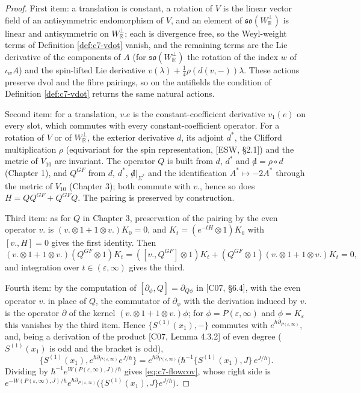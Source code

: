 \begin{proof}
First item: a translation is constant, a rotation of $V$ is the linear vector field of an antisymmetric endomorphism of $V$, and an element of $\mathfrak{so}(W_{\mathbb R}^\perp)$ is linear and antisymmetric on $W_{\mathbb R}^\perp$; each is divergence free, so the Weyl-weight terms of Definition \ref{def:c7-vdot} vanish, and the remaining terms are the Lie derivative of the components of $A$ (for $\mathfrak{so}(W_{\mathbb R}^\perp)$ the rotation of the index $w$ of $\iota_wA$) and the spin-lifted Lie derivative $v(\lambda)+\tfrac14\rho(d(v,-))\lambda$. These actions preserve $\mathrm{dvol}$ and the fibre pairings, so on the antifields the condition of Definition \ref{def:c7-vdot} returns the same natural actions.

Second item: for a translation, $v.e$ is the constant-coefficient derivative $v_1(e)$ on every slot, which commutes with every constant-coefficient operator. For a rotation of $V$ or of $W_{\mathbb R}^\perp$, the exterior derivative $d$, its adjoint $d^*$, the Clifford multiplication $\rho$ (equivariant for the spin representation, [ESW, §2.1]) and the metric of $V_{10}$ are invariant. The operator $Q$ is built from $d$, $d^*$ and ${\not d}=\rho\circ d$ (Chapter 1), and $Q^{GF}$ from $d$, $d^*$, ${\not d}|_{\Sigma^*}$ and the identification $A^*\mapsto-2A^*$ through the metric of $V_{10}$ (Chapter 3); both commute with $v.$, hence so does $H=QQ^{GF}+Q^{GF}Q$. The pairing is preserved by construction.

Third item: as for $Q$ in Chapter 3, preservation of the pairing by the even operator $v.$ is $(v.\otimes1+1\otimes v.)K_0=0$, and $K_t=(e^{-tH}\otimes1)K_0$ with $[v.,H]=0$ gives the first identity. Then
\[
(v.\otimes1+1\otimes v.)(Q^{GF}\otimes1)K_t=([v.,Q^{GF}]\otimes1)K_t+(Q^{GF}\otimes1)(v.\otimes1+1\otimes v.)K_t=0,
\]
and integration over $t\in(\varepsilon,\infty)$ gives the third.

Fourth item: by the computation of $[\partial_\phi,Q]=\partial_{Q\phi}$ in [C07, §6.4], with the even operator $v.$ in place of $Q$, the commutator of $\partial_\phi$ with the derivation induced by $v.$ is the operator $\partial$ of the kernel $(v.\otimes1+1\otimes v.)\phi$; for $\phi=P(\varepsilon,\infty)$ and $\phi=K_\varepsilon$ this vanishes by the third item. Hence $\{S^{(1)}(x_1),-\}$ commutes with $e^{\hbar\partial_{P(\varepsilon,\infty)}}$, and, being a derivation of the product [C07, Lemma 4.3.2] of even degree ($S^{(1)}(x_1)$ is odd and the bracket is odd),
\[
\{S^{(1)}(x_1),e^{\hbar\partial_{P(\varepsilon,\infty)}}e^{J/\hbar}\}=e^{\hbar\partial_{P(\varepsilon,\infty)}}\Big(\hbar^{-1}\{S^{(1)}(x_1),J\}\,e^{J/\hbar}\Big).
\]
Dividing by $\hbar^{-1}e^{W(P(\varepsilon,\infty),J)/\hbar}$ gives \eqref{eq:c7-flowcov}, whose right side is $e^{-W(P(\varepsilon,\infty),J)/\hbar}e^{\hbar\partial_{P(\varepsilon,\infty)}}\big(\{S^{(1)}(x_1),J\}e^{J/\hbar}\big)$.
\end{proof}

